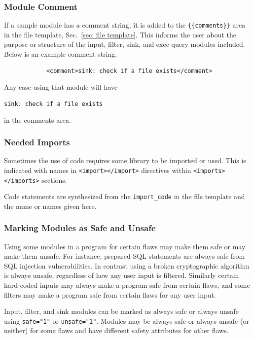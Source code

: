 \documentclass[12pt]{article}
\begin{document}
\subsubsection{Module Comment}
\label{sec:module comment}

If a sample module has a comment string, it is added to the
\verb|{{comments}}| area in the file template, Sec.~\ref{sec: file template}.
This informs the user about the purpose or structure of the input, filter, sink, and
exec query modules included.  Below is an example comment string.

\begin{verbatim}
            <comment>sink: check if a file exists</comment>
\end{verbatim}

Any case using that module will have
\begin{verbatim}
sink: check if a file exists
\end{verbatim}
in the comments area.


\subsubsection{Needed Imports}
\label{sec:module import}

Sometimes the use of code requires some library to be imported or used.  This is
indicated with names in \verb|<import></import>| directives within
\verb|<imports></imports>| sections.

Code statements are synthesized from the \verb|import_code| in the file template and
the name or names given here.


\subsubsection{Marking Modules as Safe and Unsafe}
\label{sec:safe or unsafe}

Using some modules in a program for certain flaws may make them safe or may make them
unsafe.  For instance, prepared SQL statements are always safe from SQL injection
vulnerabilities.  In contrast using a broken cryptographic algorithm is always
unsafe, regardless of how any user input is filtered.  Similarly certain
hard-coded inputs may always make a program safe from certain flaws, and some filters
may make a program safe from certain flaws for any user input.

Input, filter, and sink modules can be marked as always safe or always unsafe using
\verb|safe="1"| or \verb|unsafe="1"|.  Modules may be always safe or always unsafe
(or neither) for some flaws and have different safety attributes for other
flaws.
\end{document}
